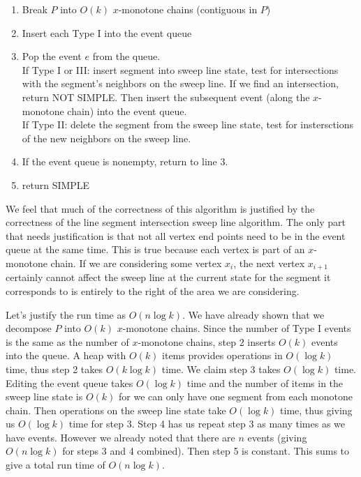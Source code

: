 \documentclass[11pt]{article}
\begin{document}
\begin{enumerate}
    \item Break $P$ into $O(k)$ $x$-monotone chains (contiguous in $P$)
    \item Insert each Type I into the event queue
    \item Pop the event $e$ from the queue. \\
        If Type I or III: insert segment into sweep line state, test for intersections with the segment's neighbors on the sweep line.
        If we find an intersection, return NOT SIMPLE.
        Then insert the subsequent event (along the $x$-monotone chain) into the event queue. \\
        If Type II: delete the segment from the sweep line state, test for instersctions of the new neighbors on the sweep line.
    \item If the event queue is nonempty, return to line 3.
    \item return SIMPLE
\end{enumerate}

We feel that much of the correctness of this algorithm is justified by the correctness of the line segment intersection sweep line algorithm.
The only part that needs justification is that not all vertex end points need to be in the event queue at the same time.
This is true because each vertex is part of an $x$-monotone chain.
If we are considering some vertex $x_i$, the next vertex $x_{i+1}$ certainly cannot affect the sweep line at the current state for the segment it corresponds to is entirely to the right of the area we are considering.

Let's justify the run time as $O(n \log k)$.
We have already shown that we decompose $P$ into $O(k)$ $x$-monotone chains.
Since the number of Type I events is the same as the number of $x$-monotone chains, step 2 inserts $O(k)$ events into the queue.
A heap with $O(k)$ items provides operations in $O(\log k)$ time, thus step 2 takes $O(k \log k)$ time.
We claim step 3 takes $O(\log k)$ time.
Editing the event queue takes $O(\log k)$ time and the number of items in the sweep line state is $O(k)$ for we can only have one segment from each monotone chain.
Then operations on the sweep line state take $O(\log k)$ time, thus giving us $O(\log k)$ time for step 3.
Step 4 has us repeat step 3 as many times as we have events.
However we already noted that there are $n$ events (giving $O(n \log k)$ for steps 3 and 4 combined).
Then step 5 is constant.
This sums to give a total run time of $O(n \log k)$.
\end{document}
